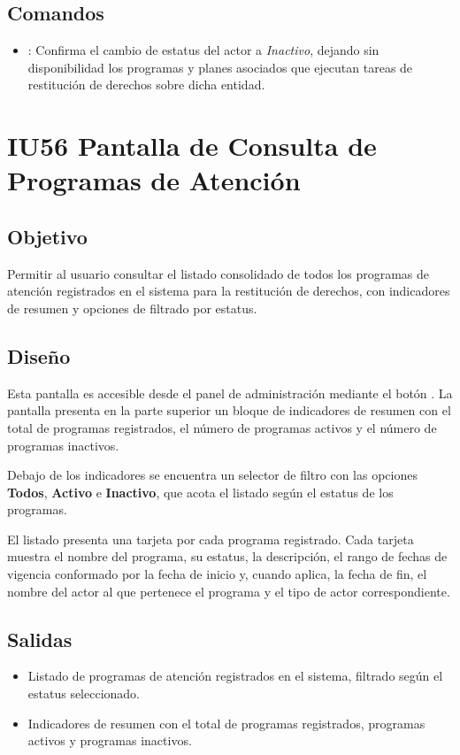 \subsection{Comandos}
\begin{itemize}
	\item {}: Confirma el cambio de estatus del actor 
	a \textit{Inactivo}, dejando sin disponibilidad los programas y planes 
	asociados que ejecutan tareas de restitución de derechos sobre dicha entidad.
\end{itemize}


\section{IU56 Pantalla de Consulta de Programas de Atención}
\subsection{Objetivo}
Permitir al usuario consultar el listado consolidado de todos los programas de 
atención registrados en el sistema para la restitución de derechos, con 
indicadores de resumen y opciones de filtrado por estatus.

\subsection{Diseño}
Esta pantalla  es 
accesible desde el panel de administración mediante el botón 
. La pantalla presenta en la parte superior un bloque 
de indicadores de resumen con el total de programas registrados, el número de 
programas activos y el número de programas inactivos.

Debajo de los indicadores se encuentra un selector de filtro con las opciones 
\textbf{Todos}, \textbf{Activo} e \textbf{Inactivo}, que acota el listado según 
el estatus de los programas.

El listado presenta una tarjeta por cada programa registrado. Cada tarjeta 
muestra el nombre del programa, su estatus, la descripción, el rango de fechas 
de vigencia conformado por la fecha de inicio y, cuando aplica, la fecha de fin, 
el nombre del actor al que pertenece el programa y el tipo de actor 
correspondiente.


\subsection{Salidas}
\begin{itemize}
	\item Listado de programas de atención registrados en el sistema, filtrado 
	según el estatus seleccionado.
	\item Indicadores de resumen con el total de programas registrados, 
	programas activos y programas inactivos.
\end{itemize}

